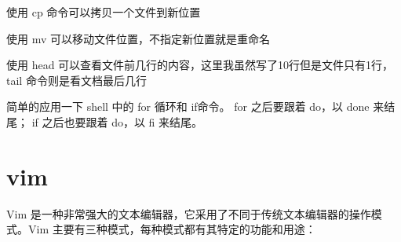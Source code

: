 \documentclass[16pt]{lzc}
\begin{document}
        使用 cp 命令可以拷贝一个文件到新位置

        使用 mv 可以移动文件位置，不指定新位置就是重命名

        使用 head 可以查看文件前几行的内容，这里我虽然写了10行但是文件只有1行，tail 命令则是看文档最后几行

        简单的应用一下 shell 中的 for 循环和 if命令。
        for 之后要跟着 do，以 done 来结尾；
        if 之后也要跟着 do，以 fi 来结尾。


    \section{vim}\label{sec:vim}

        Vim 是一种非常强大的文本编辑器，它采用了不同于传统文本编辑器的操作模式。Vim 主要有三种模式，每种模式都有其特定的功能和用途：
\end{document}
